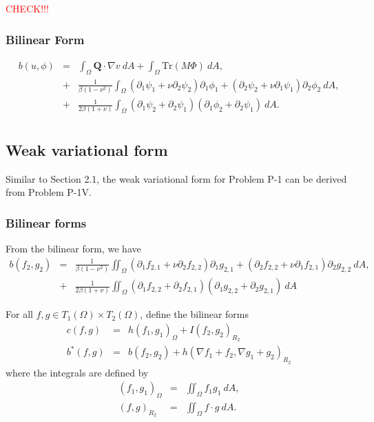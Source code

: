 \documentclass[../../main.tex]{subfiles}
\begin{document}
\textcolor{red}{CHECK!!!}
\subsubsection{Bilinear Form}
\begin{eqnarray*}
b(u,\phi) & = & \int_\Omega \boldsymbol{Q} \cdot \nabla v \ dA + \int_{\Omega} \textrm{Tr}(M\Phi) \ dA,\\
	& + & \frac{1}{\beta(1-\nu^2)}\int_{\Omega} (\partial_1\psi_1 + \nu\partial_2\psi_2)\partial_1\phi_1+ (\partial_2\psi_2 + \nu\partial_1\psi_1)\partial_2\phi_2 \ dA,\\
	& + & \frac{1}{2\beta(1+\nu)}\int_{\Omega} (\partial_1\psi_2+\partial_2\psi_1)(\partial_1\phi_2+\partial_2\psi_1) \ dA.\\
\end{eqnarray*}

\subsection{Weak variational form}
Similar to Section 2.1, the weak variational form for Problem P-1 can be derived from Problem P-1V.
\subsubsection{Bilinear forms}
From the bilinear form, we have
\begin{eqnarray*}
	b(f_2,g_2) & = & \frac{1}{\beta(1-\nu^2)}\iint_{\Omega} (\partial_1f_{2,1} + \nu\partial_2f_{2,2})\partial_1g_{2,1}+ (\partial_2f_{2,2} + \nu\partial_1f_{2,1})\partial_2g_{2,2} \ dA,\\
	& + & \frac{1}{2\beta(1+\nu)}\iint_{\Omega} (\partial_1f_{2,2}+\partial_2f_{2,1})(\partial_1g_{2,2}+\partial_2 g_{2,1}) \ dA
\end{eqnarray*}

For all $f,g \in T_1(\Omega)\times T_2(\Omega) $, define the bilinear forms
\begin{eqnarray*}
	c(f,g) & = & h(f_1,g_1)_{\Omega} + I(f_2,g_2)_{R_2} \\
	b^*(f,g) & = & b(f_2,g_2) + h(\nabla f_1 + f_2, \nabla g_1 + g_2)_{R_2}
\end{eqnarray*}
where the integrals are defined by
\begin{eqnarray*}
	(f_1,g_1)_{\Omega} & = & \iint_\Omega f_1 g_1 \ dA,\\
	(f,g)_{R_2} & = & \iint_\Omega f \cdot g \ dA.
\end{eqnarray*}
\end{document}
